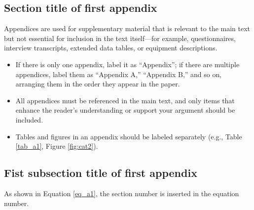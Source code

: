 
\renewcommand\theequation{\Alph{section}\arabic{equation}} %
\renewcommand\thefigure{\Alph{section}\arabic{figure}} %
\renewcommand\thetable{\Alph{section}\arabic{table}} %



\begin{appendices}



\renewcommand{\thesection}{Appendix \Alph{section}}
\renewcommand{\thesubsection}{\Alph{section}.\arabic{subsection}}

\section{Section title of first appendix}
Appendices are used for supplementary material that is relevant to the main text but not essential for inclusion in the text itself—for example, questionnaires, interview transcripts, extended data tables, or equipment descriptions.
\begin{itemize}
\item If there is only one appendix, label it as “Appendix”; if there are multiple appendices, label them as “Appendix A,” “Appendix B,” and so on, arranging them in the order they appear in the paper. 
\item All appendices must be referenced in the main text, and only items that enhance the reader’s understanding or support your argument should be included.
\item Tables and figures in an appendix should be labeled separately (e.g., Table \ref{tab_a1}, Figure \ref{fig:cat2}).
\end{itemize}

\subsection{Fist subsection title of first appendix}
As shown in Equation \ref{eq_a1}, the section number is inserted in the equation number.
\lipsum[11]


\end{appendices}
